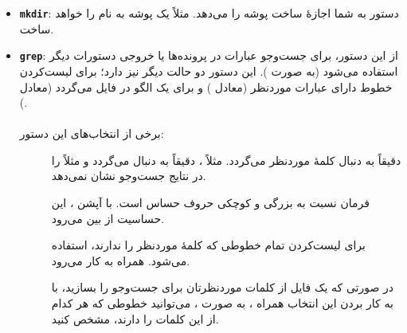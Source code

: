 \begin{itemize}
\item \textbf{\texttt{\Large mkdir}}: دستور  به شما اجازهٔ ساخت پوشه را می‌دهد. مثلاً  یک پوشه به نام  را خواهد ساخت.

\item \textbf{\texttt{\Large grep}}: از این دستور، برای جست‌وجو عبارات در پرونده‌ها یا خروجی دستورات دیگر استفاده می‌شود (به صورت ). این دستور دو حالت دیگر نیز دارد؛  برای لیست‌کردن خطوط دارای عبارات موردنظر (معادل ) و  برای یک الگو در فایل می‌گردد (معادل ).\\\\
برخی از انتخاب‌های این دستور:
\begin{description}
\item[] دقیقاً به دنبال کلمهٔ موردنظر می‌گردد. مثلاً ، دقیقاً به دنبال  می‌گردد و مثلاً  را در نتایج جست‌وجو نشان نمی‌دهد.

\item[] فرمان  نسبت به بزرگی و کوچکی حروف حساس است. با آپشن ، این حساسیت از بین می‌رود.

\item[] برای لیست‌کردن تمام خطوطی که کلمهٔ موردنظر را ندارند، استفاده می‌شود. همراه  به کار می‌رود.

\item[] در صورتی که یک فایل از کلمات موردنظرتان برای جست‌وجو را بسازید، با به کار بردن این انتخاب همراه ، به صورت ، می‌توانید خطوطی که هر کدام از این کلمات را دارند، مشخص کنید.
\end{description}
\end{itemize}

